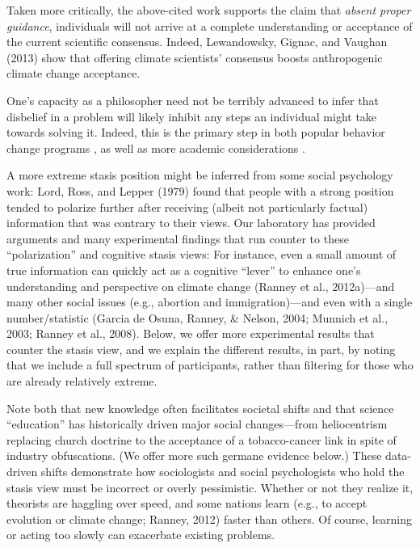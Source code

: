 Taken more critically, the above-cited work supports the claim that \emph{absent
proper guidance}, individuals will not arrive at a complete understanding or
acceptance of the current scientific consensus.
Indeed, Lewandowsky, Gignac, and
Vaughan (2013) show that offering climate scientists' consensus boosts
anthropogenic climate change acceptance.

One’s capacity as a philosopher need not be
terribly advanced to infer that disbelief in a problem will likely inhibit any
steps an individual might take towards solving it. Indeed, this is the primary
step in both popular behavior change programs \cite{twelve-step}, as well as
more academic considerations \cite{ELM}.

A more extreme stasis position might be inferred from some social psychology
work: Lord, Ross, and Lepper (1979) found that people with a strong position
tended to polarize further after receiving (albeit not particularly factual)
information that was contrary to their views. Our laboratory has provided
arguments and many experimental findings that run counter to these
``polarization'' and cognitive stasis views: For instance, even a small amount of
true information can quickly act as a cognitive ``lever'' to enhance one's
understanding and perspective on climate change (Ranney et al., 2012a)---and many
other social issues (e.g., abortion and immigration)---and even with a single
number/statistic (Garcia de Osuna, Ranney, \& Nelson, 2004; Munnich et al., 2003;
Ranney et al., 2008). Below, we offer more experimental results that counter the
stasis view, and we explain the different results, in part, by noting that we
include a full spectrum of participants, rather than filtering for those who are
already relatively extreme.

Note both that new knowledge often facilitates societal shifts and that science
``education'' has historically driven major social changes—from heliocentrism
replacing church doctrine to the acceptance of a tobacco-cancer link in spite of
industry obfuscations. (We offer more such germane evidence below.) These
data-driven shifts demonstrate how sociologists and social psychologists who
hold the stasis view must be incorrect or overly pessimistic. Whether or not
they realize it, theorists are haggling over speed, and some nations learn
(e.g., to accept evolution or climate change; Ranney, 2012) faster than others.
Of course, learning or acting too slowly can exacerbate existing problems.

